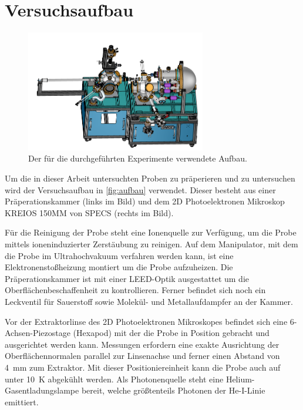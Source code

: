     \section{Versuchsaufbau}
    \label{sec:Versuchsaufbau}
        \begin{figure}
            \centering
            \includegraphics[width=0.7\textwidth]{./content/MM.png}
            \caption{Der für die durchgeführten Experimente verwendete Aufbau.}
            \label{fig:aufbau}
        \end{figure}
        Um die in dieser Arbeit untersuchten Proben zu präperieren und zu untersuchen wird der Versuchsaufbau in \autoref{fig:aufbau} verwendet.
        Dieser besteht aus einer Präperationskammer (links im Bild) und dem 2D Photoelektronen Mikroskop KREIOS 150MM von SPECS (rechts im Bild).

        Für die Reinigung der Probe steht eine Ionenquelle zur Verfügung, um die Probe mittels ioneninduzierter Zerstäubung zu reinigen.
        Auf dem Manipulator, mit dem die Probe im Ultrahochvakuum verfahren werden kann, ist eine Elektronenstoßheizung montiert um die Probe aufzuheizen.
        Die Präperationskammer ist mit einer LEED-Optik ausgestattet um die Oberflächenbeschaffenheit zu kontrollieren.
        Ferner befindet sich noch ein Leckventil für Sauerstoff sowie Molekül- und Metallaufdampfer an der Kammer.
        
        Vor der Extraktorlinse des 2D Photoelektronen Mikroskopes befindet sich eine 6-Achsen-Piezostage (Hexapod) mit der die Probe in Position gebracht und ausgerichtet werden kann.
        Messungen erfordern eine exakte Ausrichtung der Oberflächennormalen parallel zur Linsenachse und ferner einen Abstand von \SI{4}{\milli\meter} zum Extraktor.
        Mit dieser Positioniereinheit kann die Probe auch auf unter \SI{10}{\kelvin} abgekühlt werden.
        Als Photonenquelle steht eine Helium-Gasentladungslampe bereit, welche größtenteils Photonen der He-I-Linie emittiert.